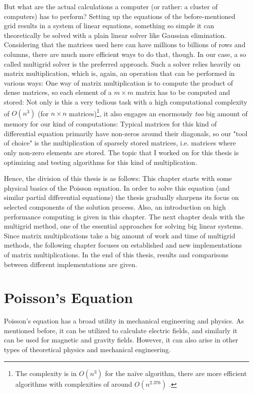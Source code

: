 But what are the actual calculations a computer (or rather: a cluster of computers) has to perform? Setting up the equations of the before-mentioned grid results in a system of linear equations, something so simple it can theoretically be solved with a plain linear solver like Gaussian elimination. Considering that the matrices used here can have millions to billions of rows and columns, there are much more efficient ways to do that, though. In our case, a so called multigrid solver is the preferred approach. Such a solver relies heavily on matrix multiplication, which is, again, an operation that can be performed in various ways: One way of matrix multiplication is to compute the product of dense matrices, so each element of a $m\times m$ matrix has to be computed and stored: Not only is this a very tedious task with a high computational complexity of $O(n^3)$ (for $n\times n$  matrices)\footnote{The complexity is in $O(n^3)$ for the naïve algorithm, there are more efficient algorithms with complexities of around $O(n^{2.376})$ \cite{COPPERSMITH1990251}.}, it also engages an enormously \textit{too} big amount of memory for our kind of computations: Typical matrices for  this kind of differential equation primarily have non-zeros around their diagonals, so our "tool of choice" is the multiplication of sparsely stored matrices, i.e. matrices where only non-zero elements are stored. The topic that I worked on for this thesis is optimizing and testing algorithms for this kind of multiplication.

Hence, the division of this thesis is as follows: This chapter starts with some physical basics of the Poisson equation. In order to solve this equation (and similar partial differential equations) the thesis gradually sharpens its focus on selected components of the solution process. Also, an introduction on high performance computing is given in this chapter. The next chapter deals with the multigrid method, one of the essential approaches for solving big linear systems. Since matrix multiplications take a big amount of work and time of multigrid methods, the following chapter focuses on established and new implementations of matrix multiplications. In the end of this thesis, results and comparisons between different implementations are given. 


\section{Poisson's Equation}
Poisson's equation has a broad utility in mechanical engineering and physics. As mentioned before, it can be utilized to calculate electric fields, and similarly it can be used for magnetic and gravity fields. However, it can also arise in other types of theoretical physics and mechanical engineering. 

